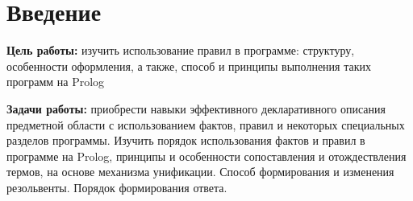 \section*{Введение}

\textbf{Цель работы:} изучить использование правил в программе: структуру,
особенности оформления, а также, способ и принципы выполнения таких программ на
Prolog

\textbf{Задачи работы:} приобрести навыки эффективного декларативного описания
предметной области с использованием фактов, правил и некоторых специальных
разделов программы. Изучить порядок использования фактов и правил в программе
на Prolog, принципы и особенности сопоставления и отождествления термов, на
основе механизма унификации. Способ формирования и изменения резольвенты.
Порядок формирования ответа.

